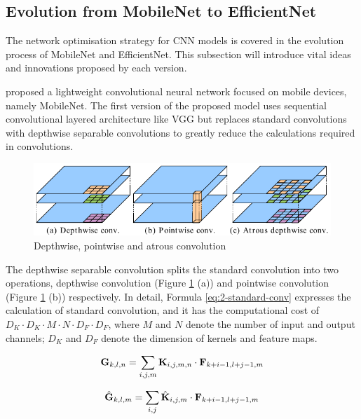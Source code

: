 \subsection{Evolution from MobileNet to EfficientNet}
\label{subsec:Evolution from MobileNet to EfficientNet}
The network optimisation strategy for CNN models is covered in the evolution process of MobileNet and EfficientNet. This subsection will introduce vital ideas and innovations proposed by each version.

\citet{howard2017mobilenets} proposed a lightweight convolutional neural network focused on mobile devices, namely MobileNet.
The first version of the proposed model uses sequential convolutional layered architecture like VGG but replaces standard convolutions with depthwise separable convolutions to greatly reduce the calculations required in convolutions.

\begin{figure}[!ht]
    \centering
    \includegraphics[width=.8\textwidth]{literature/imgs/ext-2-mobile-depth-point-atrous.pdf}
    \caption{Depthwise, pointwise and atrous convolution \cite{chen2018encoder}}
    \label{fig:ext-2-mobile-depth-point-atrous}
\end{figure}

The depthwise separable convolution splits the standard convolution into two operations, depthwise convolution (Figure \ref{fig:ext-2-mobile-depth-point-atrous} (a)) and pointwise convolution (Figure \ref{fig:ext-2-mobile-depth-point-atrous} (b)) respectively.
In detail, Formula \ref{eq:2-standard-conv} expresses the calculation of standard convolution, and it has the computational cost of $D_K \cdot D_K \cdot M \cdot N \cdot D_F \cdot D_F$, where $M$ and $N$ denote the number of input and output channels; $D_K$ and $D_F$ denote the dimension of kernels and feature maps.

\begin{minipage}[!ht]{.48\textwidth}
\begin{equation}
    \mathbf{G}_{k, l, n}=\sum_{i, j, m} \mathbf{K}_{i, j, m, n} \cdot \mathbf{F}_{k+i-1, l+j-1, m}
    \eqcite{howard2017mobilenets}
    \label{eq:2-standard-conv}
\end{equation}
\end{minipage}
\begin{minipage}[!ht]{.48\textwidth}
\begin{equation}
    \hat{\mathbf{G}}_{k, l, m}=\sum_{i, j} \hat{\mathbf{K}}_{i, j, m} \cdot \mathbf{F}_{k+i-1, l+j-1, m}
    \eqcite{howard2017mobilenets}
    \label{eq:2-depthwise-conv}
\end{equation}
\end{minipage}


